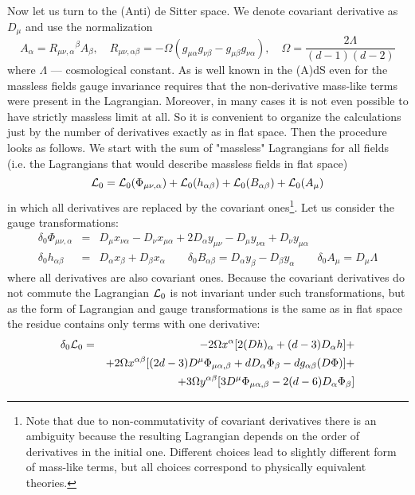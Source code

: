 \documentclass[a4paper,12pt]{article}
\begin{document}
Now let us turn to the (Anti) de Sitter space. We denote covariant
derivative as $D_\mu$ and use the normalization
\begin{equation}
[D_\mu, D_\nu] A_\alpha = R_{\mu\nu,\alpha}{}^\beta A_\beta, \quad
R_{\mu\nu,\alpha\beta} = - \Omega (g_{\mu\alpha} g_{\nu\beta} -
g_{\mu\beta} g_{\nu\alpha}), \quad \Omega =
\frac{2\Lambda}{(d-1)(d-2)}
\end{equation}
where $\Lambda$ --- cosmological constant. As is well known in the (A)dS
even for the massless fields gauge invariance requires that the
non-derivative mass-like terms were present in the Lagrangian. Moreover,
in many cases it is not even possible to have strictly massless limit at
all. So it is convenient to organize the calculations just by the number
of derivatives exactly as in flat space. Then the procedure looks as
follows. We start with the sum of "massless" Lagrangians for all fields
(i.e. the Lagrangians that would describe massless fields in flat space)
\begin{equation}
{\cal L}_0 = {\cal L}_0 (\Phi_{\mu\nu,\alpha}) + {\cal L}_0 (h_{\alpha\beta})
+ {\cal L}_0 (B_{\alpha\beta}) + {\cal L}_0 (A_\mu)
\end{equation}
in which all derivatives are replaced by the covariant ones\footnote{
Note that due to non-commutativity of covariant derivatives there is an
ambiguity because the resulting Lagrangian depends on the order of
derivatives in the initial one. Different choices lead to slightly
different form of mass-like terms, but all choices correspond to
physically equivalent theories.}. Let us consider the gauge
transformations:
\begin{eqnarray}
\delta_0 \Phi_{\mu\nu,\alpha} &=& D_\mu x_{\nu\alpha} - D_\nu x_{\mu\alpha}
+ 2 D_\alpha y_{\mu\nu} - D_\mu y_{\nu\alpha} + D_\nu y_{\mu\alpha}
\nonumber \\
\delta_0 h_{\alpha\beta} &=& D_\alpha x_\beta + D_\beta x_\alpha \qquad
\delta_0 B_{\alpha\beta} = D_\alpha y_\beta - D_\beta y_\alpha \qquad
\delta_0 A_\mu = D_\mu \Lambda
\end{eqnarray}
where all derivatives are also covariant ones. Because the covariant
derivatives do not commute the Lagrangian ${\cal L}_0$ is not invariant 
under such transformations, but as the form of Lagrangian and gauge
transformations is the same as in flat space the residue contains only 
terms with one derivative:
\begin{eqnarray}
\delta_0 {\cal L}_0 &=& - 2 \Omega x^\alpha [ 2 (D h)_\alpha + (d-3) D_\alpha
h ] + \nonumber \\
 && + 2 \Omega x^{\alpha\beta} [ (2d-3) D^\mu \Phi_{\mu\alpha,\beta} + d
 D_\alpha \Phi_\beta - d g_{\alpha\beta} (D \Phi) ] + \\
 && + 3 \Omega y^{\alpha\beta} [ 3 D^\mu \Phi_{\mu\alpha,\beta} - 2
 (d-6) D_\alpha \Phi_\beta ] \nonumber
\end{eqnarray}
\end{document}
